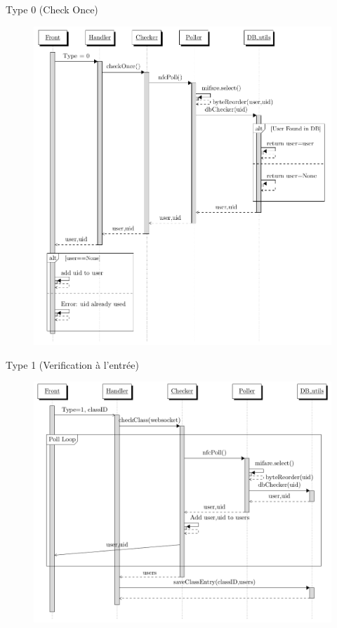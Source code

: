 \documentclass[aspectratio=169]{beamer}
\begin{document}
\begin{frame}{Type 0 (Check Once)}
  \begin{figure}[]
    \includegraphics[height=.9\textheight]{../assets/nfcSeqOnce.png}
  \end{figure}
\end{frame}

\begin{frame}{Type 1 (Verification à l'entrée)}
  \begin{figure}[]
    \includegraphics[height=.9\textheight]{../assets/nfcSeqEntry.png}
  \end{figure}
\end{frame}
\end{document}
